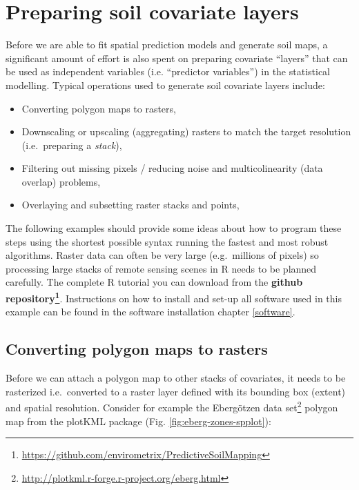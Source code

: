 \documentclass[graybox,natbib,nospthms,UStrade]{svmono}
\renewcommand{\href}[2]{#2 (\url{#1})}
\renewcommand{\href}[2]{#2\footnote{\url{#1}}}
\begin{document}
\hypertarget{preparing-soil-covariate-layers}{%
\section{Preparing soil covariate layers}\label{preparing-soil-covariate-layers}}

Before we are able to fit spatial prediction models and generate soil maps, a significant amount of effort is also spent on preparing covariate ``layers'' that can be used as independent variables (i.e. ``predictor variables'') in the statistical modelling. Typical operations used to generate soil covariate layers include:

\begin{itemize}
\item
  Converting polygon maps to rasters,
\item
  Downscaling or upscaling (aggregating) rasters to match the target resolution (i.e.~preparing a \emph{stack}),
\item
  Filtering out missing pixels / reducing noise and multicolinearity (data overlap) problems,
\item
  Overlaying and subsetting raster stacks and points,
\end{itemize}

The following examples should provide some ideas about how to program these steps using the shortest possible syntax running the fastest and most robust algorithms. Raster data can often be very large (e.g.~millions of pixels) so processing large stacks of remote sensing scenes in R needs to be planned carefully. The complete R tutorial you can download from the \textbf{\href{https://github.com/envirometrix/PredictiveSoilMapping}{github repository}}. Instructions on how to install and set-up all software used in this example can be found in the software installation chapter \ref{software}.

\hypertarget{converting-polygon-maps-to-rasters}{%
\subsection{Converting polygon maps to rasters}\label{converting-polygon-maps-to-rasters}}

Before we can attach a polygon map to other stacks of covariates, it needs to be rasterized i.e.~converted to a raster layer defined with its bounding box (extent) and spatial resolution. Consider for example the \href{http://plotkml.r-forge.r-project.org/eberg.html}{Ebergötzen data set} polygon map from the plotKML package (Fig. \ref{fig:eberg-zones-spplot}):
\end{document}
